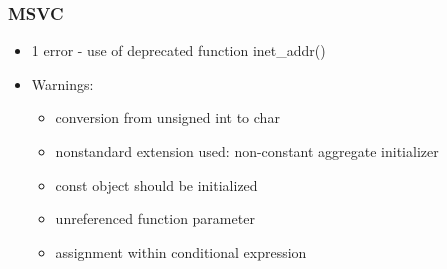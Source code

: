 \documentclass{beamer}
\begin{document}
\begin{frame}
\frametitle{MSVC}
\begin{itemize}
\item 1 error - use of deprecated function inet\_addr()
\item Warnings:
\begin{itemize}
\item conversion from unsigned int to char
\item nonstandard extension used: non-constant aggregate initializer
\item const object should be initialized
\item unreferenced function parameter
\item assignment within conditional expression
\end{itemize}
\end{itemize}
\end{frame}

\end{document}

